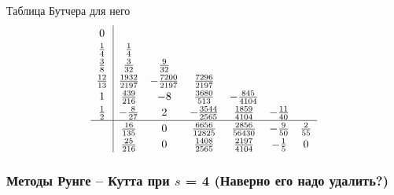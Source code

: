 \documentclass[a4paper,12pt]{article}
\begin{document}
	Таблица Бутчера для него
	 \[
	 \renewcommand\arraystretch{1.2}
	 \begin{array}
	 	{c|ccccccc}
	 	0\\
	 	\frac{1}{4} & \frac{1}{4}\\
	 	\frac{3}{8} &\frac{3}{32} &\frac{9}{32} \\
		\frac{12}{13} &\frac{1932}{2197} &-\frac{7200}{2197} &\frac{7296}{2197} \\
		1 &\frac{439}{216} &-8 &\frac{3680}{513} &-\frac{845}{4104} \\
		\frac{1}{2}&-\frac{8}{27} &2 &-\frac{3544}{2565} &\frac{1859}{4104} &-\frac{11}{40} \\
	 	\hline
	 	& \frac{16}{135} &0 &\frac{6656}{12825} &\frac{2856}{56430} &-\frac{9}{50} &\frac{2}{55}\\
		& \frac{25}{216} &0 &\frac{1408}{2565} &\frac{2197}{4104} &-\frac{1}{5} &0
	 \end{array}
	 \]

	\subsubsection{Методы Рунге – Кутта при \(s\) = 4 (Наверно его надо удалить?)}
\end{document}

